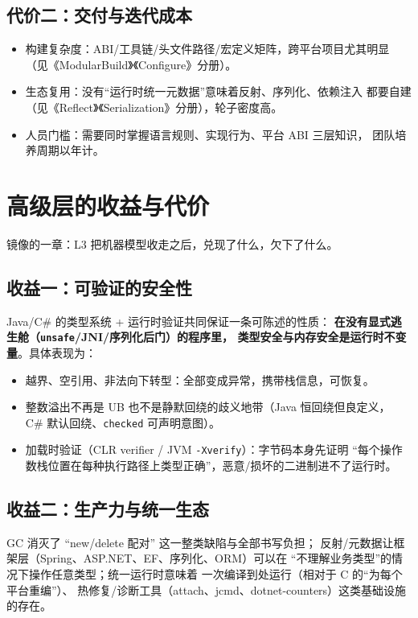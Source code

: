 \documentclass[12pt,a4paper,fontset=fandol]{ctexbook}
\begin{document}
\section{代价二：交付与迭代成本}

\begin{itemize}
  \item 构建复杂度：ABI/工具链/头文件路径/宏定义矩阵，跨平台项目尤其明显
        （见《ModularBuild》《Configure》分册）。
  \item 生态复用：没有``运行时统一元数据''意味着反射、序列化、依赖注入
        都要自建（见《Reflect》《Serialization》分册），轮子密度高。
  \item 人员门槛：需要同时掌握语言规则、实现行为、平台 ABI 三层知识，
        团队培养周期以年计。
\end{itemize}

\chapter{高级层的收益与代价}

镜像的一章：L3 把机器模型收走之后，兑现了什么，欠下了什么。

\section{收益一：可验证的安全性}

Java/C\# 的类型系统 + 运行时验证共同保证一条可陈述的性质：
\textbf{在没有显式逃生舱（\texttt{unsafe}/JNI/序列化后门）的程序里，
类型安全与内存安全是运行时不变量}。具体表现为：

\begin{itemize}
  \item 越界、空引用、非法向下转型：全部变成异常，携带栈信息，可恢复。
  \item 整数溢出不再是 UB 也不是静默回绕的歧义地带（Java 恒回绕但良定义，
        C\# 默认回绕、\texttt{checked} 可声明意图）。
  \item 加载时验证（CLR verifier / JVM \texttt{-Xverify}）：字节码本身先证明
        ``每个操作数栈位置在每种执行路径上类型正确''，恶意/损坏的二进制进不了运行时。
\end{itemize}

\section{收益二：生产力与统一生态}

GC 消灭了 ``new/delete 配对'' 这一整类缺陷与全部书写负担；
反射/元数据让框架层（Spring、ASP.NET、EF、序列化、ORM）可以在
``不理解业务类型''的情况下操作任意类型；统一运行时意味着
一次编译到处运行（相对于 C 的``为每个平台重编''）、
热修复/诊断工具（attach、jcmd、dotnet-counters）这类基础设施的存在。
\end{document}
